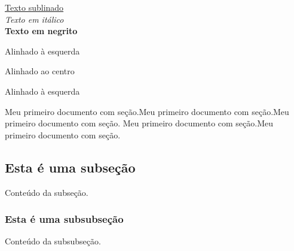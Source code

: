 \documentclass{book}
\begin{document}
	\underline{Texto sublinado}
	\\
	\textit{Texto em itálico}
	\\
	\textbf{Texto em negrito}
	\begin{flushleft}
		Alinhado à esquerda
	\end{flushleft}
		
	
	\begin{center}
		Alinhado ao centro
	\end{center}
	
	\begin{flushright}
		Alinhado à esquerda
	\end{flushright}
	
	
	Meu primeiro documento com seção.Meu primeiro documento com seção.Meu primeiro documento com seção. Meu primeiro documento com seção.Meu primeiro documento com seção.
	
	
	
	
	
	
	
	
	
	
	
	
	\subsection{Esta é uma subseção}
	
	Conteúdo da subseção.
	
	\subsubsection{Esta é uma subsubseção}
	
	Conteúdo da subsubseção.
	
\end{document}
